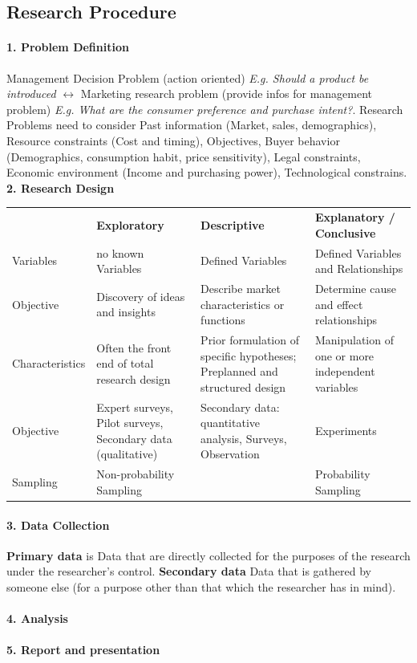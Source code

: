 \documentclass[11pt]{article}
\begin{document}
    \subsection{Research Procedure}

    \paragraph{1. Problem Definition} Management Decision Problem (action oriented) \textit{E.g. Should a product be introduced} $\leftrightarrow$ Marketing research problem (provide infos for management problem) \textit{E.g. What are the consumer preference and purchase intent?}. Research Problems need to consider Past information (Market, sales, demographics), Resource constraints (Cost and timing), Objectives, Buyer behavior (Demographics, consumption habit, price sensitivity), Legal constraints, Economic environment (Income and purchasing power), Technological constrains.\\

    \textbf{2. Research Design} \newline

    \begin{tabular}{  p{1.5cm}  p{3cm}  p{3cm}  p{3cm}  }
        &  \textbf{Exploratory}     & \textbf{Descriptive}   & \textbf{Explanatory / Conclusive} \\
        Variables 
        & no known Variables 
        & Defined Variables 
        & Defined Variables and Relationships \\
        Objective 
        & Discovery of ideas and insights
        & Describe market characteristics or functions
        & Determine cause and effect relationships \\
        Characteristics & Often the front end of total research design
        & Prior formulation of specific hypotheses; Preplanned and structured design
        & Manipulation of one or more independent variables \\
        Objective 
        & Expert surveys, Pilot surveys, Secondary data (qualitative)
        & Secondary data: quantitative analysis, Surveys, Observation
        & Experiments \\
        Sampling 
        & Non-probability Sampling 
        & 
        & Probability Sampling
    \end{tabular}

    \paragraph{3. Data Collection} \textbf{Primary data} is Data that are directly collected for the purposes of the research under the researcher’s control. \textbf{Secondary data} Data that is gathered by someone else (for a purpose other than that which the researcher has in mind).

    \paragraph{4. Analysis}

    \paragraph{5. Report and presentation}
\end{document}
